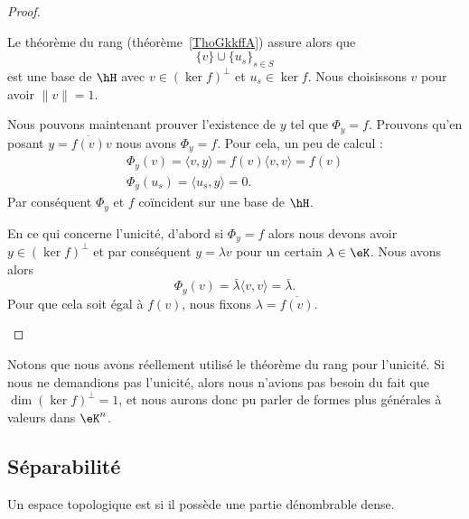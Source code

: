 \begin{proof}
\begin{subproof}
		Le théorème du rang (théorème~\ref{ThoGkkffA}) assure alors que
		\begin{equation}
			\{ v \}\cup\{ u_s \}_{s\in S}
		\end{equation}
		est une base de \( \hH\) avec \( v\in(\ker f)^{\perp}\) et \( u_s\in \ker f\). Nous choisissons \( v\) pour avoir \( \| v \|=1\).

		\spitem[Existence]

		Nous pouvons maintenant prouver l'existence de \( y\) tel que \(  \Phi_y= f\). Prouvons qu'en posant \( y=\overline{  f(v) }v\) nous avons \(  \Phi_y= f\). Pour cela, un peu de calcul :
		\begin{subequations}
			\begin{align}
				\Phi_y(v)=\langle v, y\rangle = f(v)\langle v, v\rangle = f(v) \\
				\Phi_y(u_s)=\langle u_s, y\rangle =0.
			\end{align}
		\end{subequations}
		Par conséquent \(  \Phi_y\) et \(  f\) coïncident sur une base de \( \hH\).

		\spitem[Unicité]

		En ce qui concerne l'unicité, d'abord si \(  \Phi_y= f\) alors nous devons avoir \( y\in(\ker f)^{\perp}\) et par conséquent \( y=\lambda v\) pour un certain \( \lambda\in \eK\). Nous avons alors
		\begin{equation}
			\Phi_y(v)=\bar\lambda\langle v, v\rangle =\bar\lambda.
		\end{equation}
		Pour que cela soit égal à \(  f(v)\), nous fixons \( \lambda=\overline{  f(v) }\).
	\end{subproof}
\end{proof}
Notons que nous avons réellement utilisé le théorème du rang pour l'unicité. Si nous ne demandions pas l'unicité, alors nous n'avions pas besoin du fait que \( \dim(\ker f)^{\perp}=1\), et nous aurons donc pu parler de formes plus générales à valeurs dans \( \eK^n\).

\subsection{Séparabilité}

\begin{definition}      \label{DEFooSFOJooGICSbT}
	Un espace topologique est  si il possède une partie dénombrable dense.
\end{definition}

